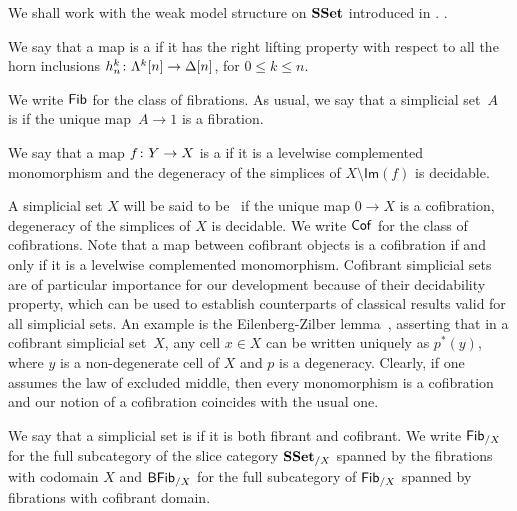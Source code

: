 \documentclass[reqno,10pt,a4paper,oneside,draft]{amsart}
\begin{document}
\medskip



We shall work  with the weak model structure on $\mathbf{SSet}$ introduced  in \cite[Section~5]{henry2018wms}. . 


\begin{definition}  We say that a map is a  if it has the right lifting property with respect to all the horn inclusions $h^k_n  \colon \Lambda^k[n] \to \Delta[n]$, for $0 \leq k \leq n$. 
\end{definition}

We write $\mathsf{Fib}$ for the class of fibrations. As usual, we say that a simplicial set~$A$ is  if 
 \ie the unique map~$A \to 1$ is a fibration.


\begin{definition} We say that  a map $f \colon Y \to X$ is a  if 
it is a levelwise complemented monomorphism and the degeneracy of the simplices of $X \setminus \mathsf{Im}(f)$ is decidable. 
\end{definition}



A simplicial set $X$ will be said to be~ if the unique map $0 \to X$ is a cofibration, 
\ie degeneracy of the simplices of $X$ is decidable.
We write $\mathsf{Cof}$ for the class of cofibrations.  Note that a map between cofibrant objects is a cofibration
if and only if it is a levelwise complemented monomorphism. 
Cofibrant simplicial sets are of particular importance for our development because of their decidability property, which can be used to establish counterparts of classical results valid for all simplicial sets. An example is the Eilenberg-Zilber lemma~\cite{henry2018wms}, asserting that in a cofibrant simplicial set~$X$, any cell $x \in X$ can be written uniquely as $p^*(y)$, where $y$ is a non-degenerate cell of $X$ and $p$ is a degeneracy. Clearly, if one assumes the law of excluded middle, then every monomorphism is a cofibration and our notion of a cofibration coincides with the usual one. 


\medskip


We say that a simplicial set is  if it is both fibrant and cofibrant.  We write $\mathsf{Fib}_{/X}$ for the full subcategory of the slice category $\mathbf{SSet}_{/X}$ spanned by the fibrations with codomain $X$
and $\mathsf{BFib}_{/X}$ for  the full subcategory of  $\mathsf{Fib}_{/X}$ spanned by fibrations with cofibrant domain.
\end{document}
